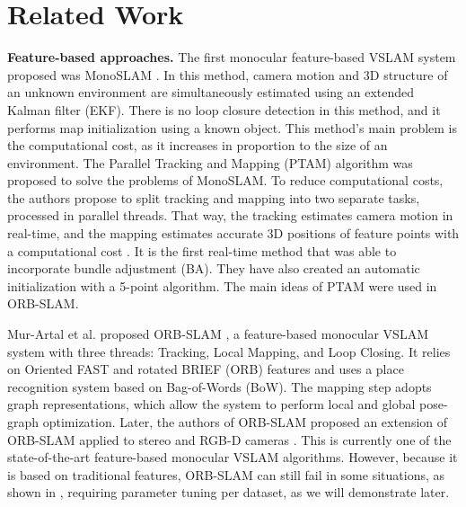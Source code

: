 \section{Related Work}

\textbf{Feature-based approaches.} The first monocular feature-based VSLAM system proposed was MonoSLAM \cite{monoslam}. In this method, camera motion and 3D structure of an unknown environment are simultaneously estimated using an extended Kalman filter (EKF). There is no loop closure detection in this method, and it performs map initialization using a known object. This method's main problem is the computational cost, as it increases in proportion to the size of an environment. The Parallel Tracking and Mapping (PTAM) \cite{ptam} algorithm was proposed to solve the problems of MonoSLAM. To reduce computational costs, the authors propose to split tracking and mapping into two separate tasks, processed in parallel threads. That way, the tracking estimates camera motion in real-time, and the mapping estimates accurate 3D positions of feature points with a computational cost \cite{survey-visual-slam}. It is the first real-time method that was able to incorporate bundle adjustment (BA). They have also created an automatic initialization with a 5-point algorithm. The main ideas of PTAM were used in ORB-SLAM. 

Mur-Artal et al. proposed ORB-SLAM \cite{orb-slam}, a feature-based monocular VSLAM system with three threads: Tracking, Local Mapping, and Loop Closing. It relies on Oriented FAST and rotated BRIEF (ORB) features and uses a place recognition system based on Bag-of-Words (BoW). The mapping step adopts graph representations, which allow the system to perform local and global pose-graph optimization. Later, the authors of ORB-SLAM proposed an extension of ORB-SLAM applied to stereo and RGB-D cameras \cite{orb-slam2}. This is currently one of the state-of-the-art feature-based monocular VSLAM algorithms. However, because it is based on traditional features, ORB-SLAM can still fail in some situations, as shown in \cite{gcnv2}, requiring parameter tuning per dataset, as we will demonstrate later.


